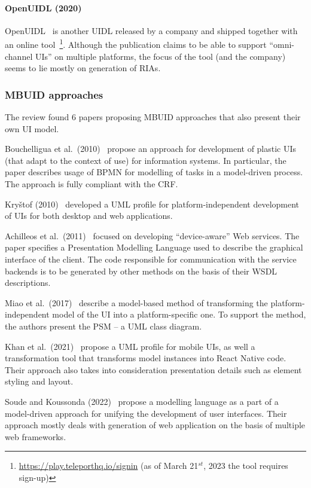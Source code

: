 \paragraph{OpenUIDL (2020)}
OpenUIDL~\cite{Moldovan2020} is another UIDL released by a company and shipped together with an online tool~\footnote{\url{https://play.teleporthq.io/signin} (as of March 21$^{st}$, 2023 the tool requires sign-up)}.
Although the publication claims to be able to support \enquote{omni-channel UIs} on multiple platforms, the focus of the tool (and the company) seems to lie mostly on generation of RIAs.

\subsubsection{MBUID approaches}

The review found 6 papers proposing MBUID approaches that also present their own UI model.

Bouchelligua et al.\ (2010)~\cite{Bouchelligua2010} propose an approach for development of plastic UIs (that adapt to the context of use) for information systems.
In particular, the paper describes usage of BPMN for modelling of tasks in a model-driven process.
The approach is fully compliant with the CRF\@.

Kryštof (2010)~\cite{kryvstof2010lpgm} developed a UML profile for platform-independent development of UIs for both desktop and web applications.

Achilleos et al.\ (2011)~\cite{Achilleos2011} focused on developing \enquote{device-aware} Web services.
The paper specifies a Presentation Modelling Language used to describe the graphical interface of the client.
The code responsible for communication with the service backends is to be generated by other methods on the basis of their WSDL descriptions.

Miao et al.\ (2017)~\cite{Miao2017} describe a model-based method of transforming the platform-independent model of the UI into a platform-specific one.
To support the method, the authors present the PSM -- a UML class diagram.

Khan et al.\ (2021)~\cite{Khan2021} propose a UML profile for mobile UIs, as well a transformation tool that transforms model instances into React Native code.
Their approach also takes into consideration presentation details such as element styling and layout.

Soude and Koussonda (2022)~\cite{Soude2022} propose a modelling language as a part of a model-driven approach for unifying the development of user interfaces.
Their approach mostly deals with generation of web application on the basis of multiple web frameworks.

